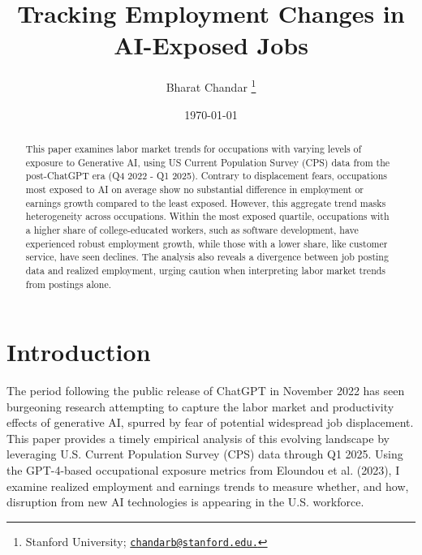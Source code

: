\documentclass[12pt]{article}
\date{}
\title{Tracking Employment Changes in AI-Exposed Jobs}
\author{Bharat Chandar \footnote{Stanford University; \href{mailto:email}{\texttt{chandarb@stanford.edu.}} }}
\date{\today}
\numberwithin{equation}{section}
\theoremstyle{theorem}\newcustomtheorem{theorem}{{\bf\sc Theorem}}
\theoremstyle{definition}\newcustomtheorem{assumption}{{\bf\sc Assumption}}
\theoremstyle{theorem} \newcustomtheorem{proposition}{{\bf\sc Proposition}}
\begin{document}
\maketitle

\begin{abstract}
	This paper examines labor market trends for occupations with varying levels of exposure to Generative AI, using US Current Population Survey (CPS) data from the post-ChatGPT era (Q4 2022 - Q1 2025). Contrary to displacement fears, occupations most exposed to AI on average show no substantial difference in employment or earnings growth compared to the least exposed. However, this aggregate trend masks heterogeneity across occupations. Within the most exposed quartile, occupations with a higher share of college-educated workers, such as software development, have experienced robust employment growth, while those with a lower share, like customer service, have seen declines. The analysis also reveals a divergence between job posting data and realized employment, urging caution when interpreting labor market trends from postings alone.
\end{abstract}

\setlength{\abovedisplayskip}{6pt}
\setlength{\belowdisplayskip}{6pt}

\section{Introduction}

The period following the public release of ChatGPT in November 2022 has seen burgeoning research attempting to capture the labor market and productivity effects of generative AI, spurred by fear of potential widespread job displacement. This paper provides a timely empirical analysis of this evolving landscape by leveraging U.S. Current Population Survey (CPS) data through Q1 2025. Using the GPT-4-based occupational exposure metrics from Eloundou et al. (2023), I examine realized employment and earnings trends to measure whether, and how, disruption from new AI technologies is appearing in the U.S. workforce.
\end{document}
